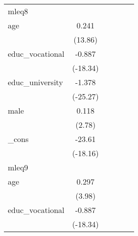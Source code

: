 {\begin{tabular}{l*{5}{c}}
\hline
mleq8       &                     &                     &                     &                     &                     \\
age         &       0.241\sym{***}&                     &                     &                     &                     \\
            &     (13.86)         &                     &                     &                     &                     \\
[1em]
educ\_vocational&      -0.887\sym{***}&                     &                     &                     &                     \\
            &    (-18.34)         &                     &                     &                     &                     \\
[1em]
educ\_university&      -1.378\sym{***}&                     &                     &                     &                     \\
            &    (-25.27)         &                     &                     &                     &                     \\
[1em]
male        &       0.118\sym{**} &                     &                     &                     &                     \\
            &      (2.78)         &                     &                     &                     &                     \\
[1em]
\_cons      &      -23.61\sym{***}&                     &                     &                     &                     \\
            &    (-18.16)         &                     &                     &                     &                     \\
\hline
mleq9       &                     &                     &                     &                     &                     \\
age         &       0.297\sym{***}&                     &                     &                     &                     \\
            &      (3.98)         &                     &                     &                     &                     \\
[1em]
educ\_vocational&      -0.887\sym{***}&                     &                     &                     &                     \\
            &    (-18.34)         &                     &                     &                     &                     \\

\end{tabular}}
